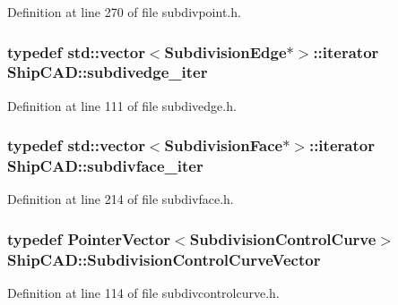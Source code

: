 Definition at line 270 of file subdivpoint.\+h.

\subsubsection[{\texorpdfstring{subdivedge\+\_\+iter}{subdivedge_iter}}]{\setlength{\rightskip}{0pt plus 5cm}typedef std\+::vector$<${\bf Subdivision\+Edge}$\ast$$>$\+::iterator {\bf Ship\+C\+A\+D\+::subdivedge\+\_\+iter}}\hypertarget{namespaceShipCAD_a7767250c742ad6114e3f076743d18461}{}\label{namespaceShipCAD_a7767250c742ad6114e3f076743d18461}


Definition at line 111 of file subdivedge.\+h.

\subsubsection[{\texorpdfstring{subdivface\+\_\+iter}{subdivface_iter}}]{\setlength{\rightskip}{0pt plus 5cm}typedef std\+::vector$<${\bf Subdivision\+Face}$\ast$$>$\+::iterator {\bf Ship\+C\+A\+D\+::subdivface\+\_\+iter}}\hypertarget{namespaceShipCAD_a14b9ceea38e54192b32764021161d199}{}\label{namespaceShipCAD_a14b9ceea38e54192b32764021161d199}


Definition at line 214 of file subdivface.\+h.

\subsubsection[{\texorpdfstring{Subdivision\+Control\+Curve\+Vector}{SubdivisionControlCurveVector}}]{\setlength{\rightskip}{0pt plus 5cm}typedef {\bf Pointer\+Vector}$<${\bf Subdivision\+Control\+Curve}$>$ {\bf Ship\+C\+A\+D\+::\+Subdivision\+Control\+Curve\+Vector}}\hypertarget{namespaceShipCAD_aa9dd7a826ae5254e377dac43ea19da80}{}\label{namespaceShipCAD_aa9dd7a826ae5254e377dac43ea19da80}


Definition at line 114 of file subdivcontrolcurve.\+h.

